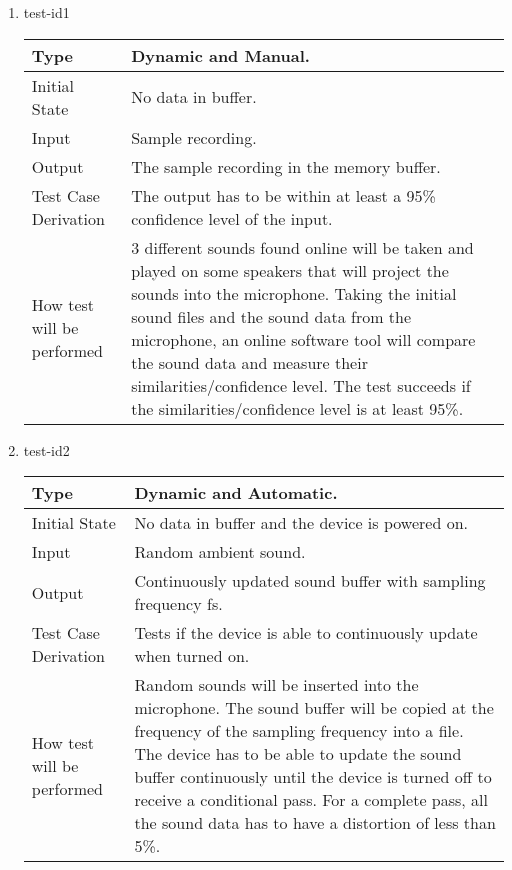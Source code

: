 \documentclass[12pt, titlepage]{article}
\begin{document}
\begin{enumerate}

\item{test-id1\\}

\begin{tabular}{ |p{5cm}||p{7cm}| }
    \hline
    Type & Dynamic and Manual. \\
    \hline
    Initial State  &  No data in buffer. \\
    \hline
    Input &   Sample recording. \\
    \hline
    Output &   The sample recording in the memory buffer.  \\
    \hline
    Test Case Derivation &   The output has to be within at least a 95\% confidence level of the input. \\
    \hline
    How test will be performed & 3 different sounds found online will be taken and played on some speakers that will project the sounds into the microphone. Taking the initial sound files and the sound data from the microphone, an online software tool will compare the sound data and measure their similarities/confidence level. The test succeeds if the similarities/confidence level is at least 95\%. \\
    \hline
\end{tabular}

\item{test-id2\\}

\begin{tabular}{ |p{5cm}||p{7cm}| }
    \hline
    Type & Dynamic and Automatic. \\
    \hline
    Initial State  &  No data in buffer and the device is powered on. \\
    \hline
    Input &   Random ambient sound. \\
    \hline
    Output &   Continuously updated sound buffer with sampling frequency fs.  \\
    \hline
    Test Case Derivation &   Tests if the device is able to continuously update when turned on. \\
    \hline
    How test will be performed & Random sounds will be inserted into the microphone. The sound buffer will be copied at the frequency of the sampling frequency into a file. The device has to be able to update the sound buffer continuously until the device is turned off to receive a conditional pass. For a complete pass, all the sound data has to have a distortion of less than 5\%. \\
    \hline
\end{tabular}

\end{enumerate}
\end{document}
